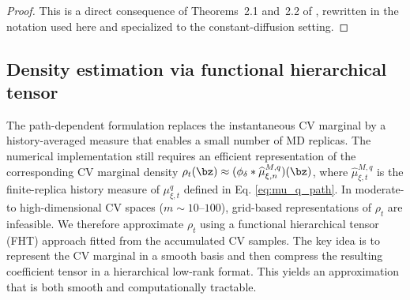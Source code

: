 \documentclass[a4paper,fleqn]{cas-sc}
\theoremstyle{definition}
\begin{document}
\begin{proof}
This is a direct consequence of Theorems~2.1 and~2.2 of
\cite{du2023empirical}, rewritten in the notation used here and specialized to
the constant-diffusion setting.
\end{proof}








\subsection{Density estimation via functional hierarchical tensor}
\label{subsec:density_estimation}




The path-dependent formulation replaces the instantaneous CV marginal by a history-averaged measure that enables a small number of MD replicas. The numerical implementation still requires an efficient representation of the corresponding CV marginal density 
$\rho_t(\bz) \approx
(\phi_\delta * \widehat\mu_{\xi, n}^{M,q})(\bz)$, where $\widehat\mu_{\xi, t}^{M,q}$ is the finite-replica history measure of $\mu_{\xi, t}^q$ defined in Eq. \eqref{eq:mu_q_path}. In moderate- to high-dimensional CV spaces ($m\sim 10$--$100$), grid-based representations of \(\rho_t\) are infeasible.  We therefore approximate \(\rho_t\) using a functional hierarchical tensor (FHT)  approach \cite{tang2024solving} fitted from the accumulated CV samples. The key idea is to represent the CV marginal in a smooth basis and then compress the resulting coefficient tensor in a hierarchical low-rank format. This yields an approximation that is both smooth and computationally tractable.
\end{document}
